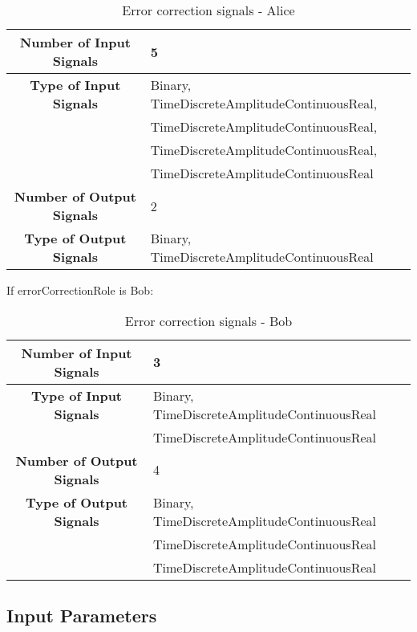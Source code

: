 \begin{table}[h]
	\begin{tabular}{|c|l|}
		\hline
		\textbf{Number of Input Signals} & 5 \\ \hline
        \textbf{Type of Input Signals} & Binary,
        TimeDiscreteAmplitudeContinuousReal,\\
        & TimeDiscreteAmplitudeContinuousReal,\\
		& TimeDiscreteAmplitudeContinuousReal,\\
		& TimeDiscreteAmplitudeContinuousReal \\ \hline
    	\textbf{Number of Output Signals} & 2 \ \\ \hline
        \textbf{Type of Output Signals} & Binary, TimeDiscreteAmplitudeContinuousReal \\ \hline
	\end{tabular}
	\caption{Error correction signals - Alice}
	\label{table:bin_sour_signals}
\end{table}

If errorCorrectionRole is Bob:

\begin{table}[h]
	\begin{tabular}{|c|l|}
		\hline
		\textbf{Number of Input Signals} & 3 \\ \hline
		\textbf{Type of Input Signals} & Binary, TimeDiscreteAmplitudeContinuousReal\\
		& TimeDiscreteAmplitudeContinuousReal \\ \hline
    	\textbf{Number of Output Signals} & 4 \ \\ \hline
		\textbf{Type of Output Signals} & Binary, TimeDiscreteAmplitudeContinuousReal\\
		& TimeDiscreteAmplitudeContinuousReal \\
		& TimeDiscreteAmplitudeContinuousReal \\ \hline
	\end{tabular}
	\caption{Error correction signals - Bob}
	\label{table:bin_sour_signals}
\end{table}


\subsection*{Input Parameters}

